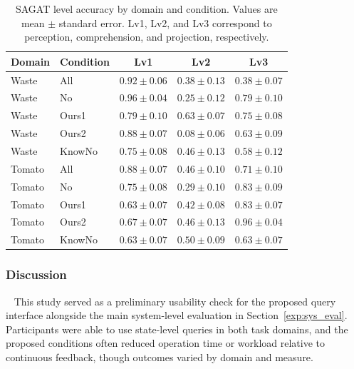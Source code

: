 \begin{table}[t]
\centering
\caption{SAGAT level accuracy by domain and condition. Values are mean $\pm$ standard error. Lv1, Lv2, and Lv3 correspond to perception, comprehension, and projection, respectively.}
\label{tab:user_sagat_levels}
\small
\setlength{\tabcolsep}{4pt}
\begin{tabular*}{\textwidth}{@{\extracolsep{\fill}}llccc}
\toprule
\textbf{Domain} & \textbf{Condition} & \textbf{Lv1} & \textbf{Lv2} & \textbf{Lv3} \\
\midrule
Waste & All & $0.92 \pm 0.06$ & $0.38 \pm 0.13$ & $0.38 \pm 0.07$ \\
Waste & No & $0.96 \pm 0.04$ & $0.25 \pm 0.12$ & $0.79 \pm 0.10$ \\
Waste & Ours1 & $0.79 \pm 0.10$ & $0.63 \pm 0.07$ & $0.75 \pm 0.08$ \\
Waste & Ours2 & $0.88 \pm 0.07$ & $0.08 \pm 0.06$ & $0.63 \pm 0.09$ \\
Waste & KnowNo & $0.75 \pm 0.08$ & $0.46 \pm 0.13$ & $0.58 \pm 0.12$ \\
\midrule
Tomato & All & $0.88 \pm 0.07$ & $0.46 \pm 0.10$ & $0.71 \pm 0.10$ \\
Tomato & No & $0.75 \pm 0.08$ & $0.29 \pm 0.10$ & $0.83 \pm 0.09$ \\
Tomato & Ours1 & $0.63 \pm 0.07$ & $0.42 \pm 0.08$ & $0.83 \pm 0.07$ \\
Tomato & Ours2 & $0.67 \pm 0.07$ & $0.46 \pm 0.13$ & $0.96 \pm 0.04$ \\
Tomato & KnowNo & $0.63 \pm 0.07$ & $0.50 \pm 0.09$ & $0.63 \pm 0.07$ \\
\bottomrule
\end{tabular*}
\end{table}

\subsubsection{Discussion}~\label{user:discussion}
This study served as a preliminary usability check for the proposed query interface alongside the main system-level evaluation in Section~\ref{exp:sys_eval}. Participants were able to use state-level queries in both task domains, and the proposed conditions often reduced operation time or workload relative to continuous feedback, though outcomes varied by domain and measure.


